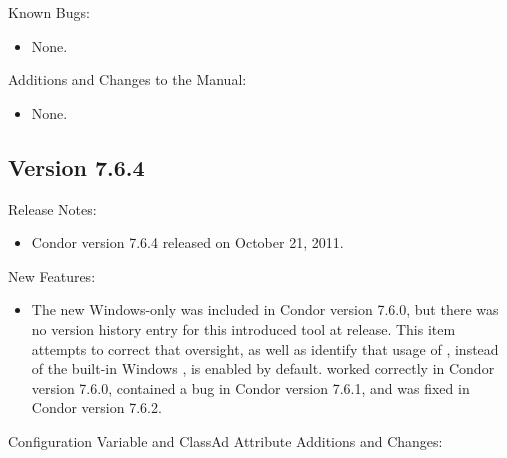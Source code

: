 \noindent Known Bugs:

\begin{itemize}

\item None.

\end{itemize}

\noindent Additions and Changes to the Manual:

\begin{itemize}

\item None.

\end{itemize}


\subsection*{\label{sec:New-7-6-4}Version 7.6.4}

\noindent Release Notes:

\begin{itemize}

\item Condor version 7.6.4 released on October 21, 2011.

\end{itemize}


\noindent New Features:

\begin{itemize}

\item The new Windows-only  was included in Condor version 7.6.0,
but there was no version history entry for this introduced tool at release.
This item attempts to correct that oversight, 
as well as identify that usage of ,
instead of the built-in Windows , 
is enabled by default.
 worked correctly in Condor version 7.6.0, 
contained a bug in Condor version 7.6.1,
and was fixed in Condor version 7.6.2.


\end{itemize}

\noindent Configuration Variable and ClassAd Attribute Additions and Changes:

